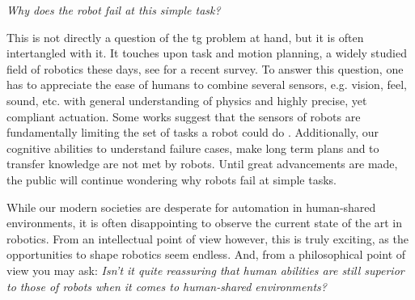 \textit{Why does the robot fail at this simple task?}

This is not directly a question of the \ac{tg} problem at
hand, but it is often intertangled with it. It touches upon
task and motion planning, a widely studied field of robotics
these days, see \cite{garrett2021integrated} for a recent
survey. To answer this question, one has to appreciate the
ease of humans to combine several sensors, e.g. vision,
feel, sound, etc. with general understanding of physics and
highly precise, yet compliant actuation. Some works suggest
that the sensors of robots are fundamentally limiting the set of
tasks a robot could do \cite{majumdar2023fundamental}.
Additionally, our cognitive abilities to understand failure
cases, make long term plans and to transfer knowledge are
not met by robots. Until great advancements are made, the
public will continue wondering why robots fail at simple
tasks.

While our modern societies are desperate for automation in human-shared
environments, it is often disappointing to observe the current state of the art
in robotics. From an intellectual point of view however, this is truly exciting,
as the opportunities to shape robotics seem endless. And, from a philosophical
point of view you may ask: \textit{Isn't it quite reassuring that human
abilities are still superior to those of robots when it
comes to human-shared environments?}

